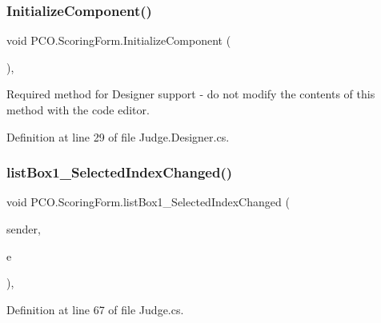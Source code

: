 \mbox{\label{classPCO_1_1ScoringForm_abd29ec860b946c404af7f6164c826ce6}} 
\subsubsection{\texorpdfstring{Initialize\+Component()}{InitializeComponent()}}
{\footnotesize\ttfamily void P\+C\+O.\+Scoring\+Form.\+Initialize\+Component (\begin{DoxyParamCaption}{ }\end{DoxyParamCaption})\hspace{0.3cm}{\ttfamily [inline]}, {\ttfamily [private]}}



Required method for Designer support -\/ do not modify the contents of this method with the code editor. 



Definition at line 29 of file Judge.\+Designer.\+cs.

\mbox{\label{classPCO_1_1ScoringForm_ada0fdb924f604b7c6949dba6e9500ea1}} 
\subsubsection{\texorpdfstring{list\+Box1\+\_\+\+Selected\+Index\+Changed()}{listBox1\_SelectedIndexChanged()}}
{\footnotesize\ttfamily void P\+C\+O.\+Scoring\+Form.\+list\+Box1\+\_\+\+Selected\+Index\+Changed (\begin{DoxyParamCaption}\item[{object}]{sender,  }\item[{Event\+Args}]{e }\end{DoxyParamCaption})\hspace{0.3cm}{\ttfamily [inline]}, {\ttfamily [private]}}



Definition at line 67 of file Judge.\+cs.



